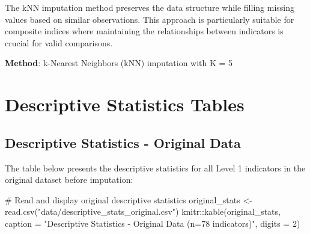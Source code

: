 \documentclass[
  letterpaper,
  DIV=11,
  numbers=noendperiod]{scrartcl}
\newenvironment{Shaded}{\begin{snugshade}}{\end{snugshade}}
\newcommand{\AttributeTok}[1]{\textcolor[rgb]{0.40,0.45,0.13}{#1}}
\newcommand{\CommentTok}[1]{\textcolor[rgb]{0.37,0.37,0.37}{#1}}
\newcommand{\DecValTok}[1]{\textcolor[rgb]{0.68,0.00,0.00}{#1}}
\newcommand{\FunctionTok}[1]{\textcolor[rgb]{0.28,0.35,0.67}{#1}}
\newcommand{\NormalTok}[1]{\textcolor[rgb]{0.00,0.23,0.31}{#1}}
\newcommand{\OtherTok}[1]{\textcolor[rgb]{0.00,0.23,0.31}{#1}}
\newcommand{\SpecialCharTok}[1]{\textcolor[rgb]{0.37,0.37,0.37}{#1}}
\newcommand{\StringTok}[1]{\textcolor[rgb]{0.13,0.47,0.30}{#1}}
\begin{document}
The kNN imputation method preserves the data structure while filling
missing values based on similar observations. This approach is
particularly suitable for composite indices where maintaining the
relationships between indicators is crucial for valid comparisons.

\textbf{Method}: k-Nearest Neighbors (kNN) imputation with K = 5

\section{Descriptive Statistics
Tables}\label{descriptive-statistics-tables}

\subsection{Descriptive Statistics - Original
Data}\label{descriptive-statistics---original-data}

The table below presents the descriptive statistics for all Level 1
indicators in the original dataset before imputation:

\begin{Shaded}
\begin{Highlighting}[]
\CommentTok{\# Read and display original descriptive statistics}
\NormalTok{original\_stats }\OtherTok{\textless{}{-}} \FunctionTok{read.csv}\NormalTok{(}\StringTok{"data/descriptive\_stats\_original.csv"}\NormalTok{)}
\NormalTok{knitr}\SpecialCharTok{::}\FunctionTok{kable}\NormalTok{(original\_stats, }\AttributeTok{caption =} \StringTok{"Descriptive Statistics {-} Original Data (n=78 indicators)"}\NormalTok{, }\AttributeTok{digits =} \DecValTok{2}\NormalTok{)}
\end{Highlighting}
\end{Shaded}
\end{document}
